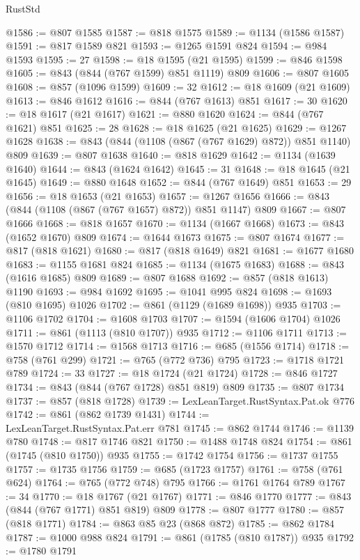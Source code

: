 \begin{lexlean}{RustStd}
\begin{coremodule}
@1586 := @807 @1585
@1587 := @818 @1575
@1589 := @1134 (@1586 @1587)
@1591 := @817 @1589 @821
@1593 := @1265 @1591 @824
@1594 := @984 @1593
@1595 := 27
@1598 := @18 @1595 (@21 @1595)
@1599 := @846 @1598
@1605 := @843 (@844 (@767 @1599) @851 @1119) @809
@1606 := @807 @1605
@1608 := @857 (@1096 @1599)
@1609 := 32
@1612 := @18 @1609 (@21 @1609)
@1613 := @846 @1612
@1616 := @844 (@767 @1613) @851
@1617 := 30
@1620 := @18 @1617 (@21 @1617)
@1621 := @880 @1620
@1624 := @844 (@767 @1621) @851
@1625 := 28
@1628 := @18 @1625 (@21 @1625)
@1629 := @1267 @1628
@1638 := @843 (@844 (@1108 (@867 (@767 @1629) @872)) @851 @1140) @809
@1639 := @807 @1638
@1640 := @818 @1629
@1642 := @1134 (@1639 @1640)
@1644 := @843 (@1624 @1642)
@1645 := 31
@1648 := @18 @1645 (@21 @1645)
@1649 := @880 @1648
@1652 := @844 (@767 @1649) @851
@1653 := 29
@1656 := @18 @1653 (@21 @1653)
@1657 := @1267 @1656
@1666 := @843 (@844 (@1108 (@867 (@767 @1657) @872)) @851 @1147) @809
@1667 := @807 @1666
@1668 := @818 @1657
@1670 := @1134 (@1667 @1668)
@1673 := @843 (@1652 @1670) @809
@1674 := @1644 @1673
@1675 := @807 @1674
@1677 := @817 (@818 @1621)
@1680 := @817 (@818 @1649) @821
@1681 := @1677 @1680
@1683 := @1155 @1681 @824
@1685 := @1134 (@1675 @1683)
@1688 := @843 (@1616 @1685) @809
@1689 := @807 @1688
@1692 := @857 (@818 @1613) @1190
@1693 := @984 @1692
@1695 := @1041 @995 @824
@1698 := @1693 (@810 @1695) @1026
@1702 := @861 (@1129 (@1689 @1698)) @935
@1703 := @1106 @1702
@1704 := @1608 @1703
@1707 := @1594 (@1606 @1704) @1026
@1711 := @861 (@1113 (@810 @1707)) @935
@1712 := @1106 @1711
@1713 := @1570 @1712
@1714 := @1568 @1713
@1716 := @685 (@1556 @1714)
@1718 := @758 (@761 @299)
@1721 := @765 (@772 @736) @795
@1723 := @1718 @1721 @789
@1724 := 33
@1727 := @18 @1724 (@21 @1724)
@1728 := @846 @1727
@1734 := @843 (@844 (@767 @1728) @851 @819) @809
@1735 := @807 @1734
@1737 := @857 (@818 @1728)
@1739 := LexLeanTarget.RustSyntax.Pat.ok @776
@1742 := @861 (@862 @1739 @1431)
@1744 := LexLeanTarget.RustSyntax.Pat.err @781
@1745 := @862 @1744
@1746 := @1139 @780
@1748 := @817 @1746 @821
@1750 := @1488 @1748 @824
@1754 := @861 (@1745 (@810 @1750)) @935
@1755 := @1742 @1754
@1756 := @1737 @1755
@1757 := @1735 @1756
@1759 := @685 (@1723 @1757)
@1761 := @758 (@761 @624)
@1764 := @765 (@772 @748) @795
@1766 := @1761 @1764 @789
@1767 := 34
@1770 := @18 @1767 (@21 @1767)
@1771 := @846 @1770
@1777 := @843 (@844 (@767 @1771) @851 @819) @809
@1778 := @807 @1777
@1780 := @857 (@818 @1771)
@1784 := @863 @85 @23 (@868 @872)
@1785 := @862 @1784
@1787 := @1000 @988 @824
@1791 := @861 (@1785 (@810 @1787)) @935
@1792 := @1780 @1791

\end{coremodule}
\end{lexlean}
